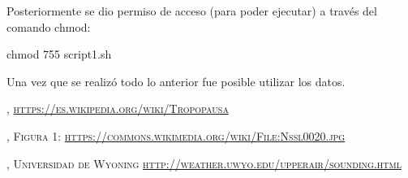 \documentclass[12pt]{article}
\begin{document}
Posteriormente se dio permiso de acceso (para poder ejecutar) a través del comando chmod:

chmod 755 script1.sh


Una vez que se realizó todo lo anterior fue posible utilizar los datos.









\renewcommand{\refname}{\section*{Bibliografía}}
\begin{thebibliography}{9}
, \textsc{\url{https://es.wikipedia.org/wiki/Tropopausa}}

, \textsc{Figura 1: \url{https://commons.wikimedia.org/wiki/File:Nssl0020.jpg}}

, \textsc{Universidad de Wyoning \url{http://weather.uwyo.edu/upperair/sounding.html}}

\end{thebibliography}
\end{document}
